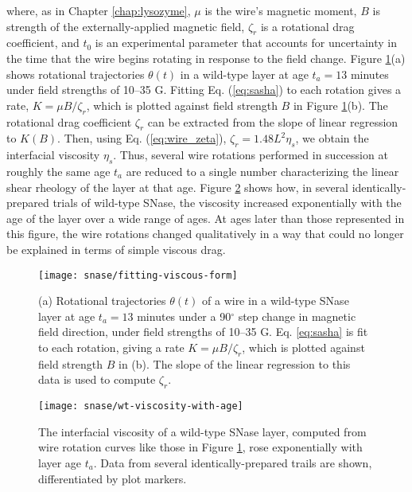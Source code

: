 \noindent where, as in Chapter \ref{chap:lysozyme}, $\mu$ is the wire's magnetic moment, $B$ is strength of the externally-applied magnetic field, $\zeta_r$ is a rotational drag coefficient, and $t_0$ is an experimental parameter that accounts for uncertainty in the time that the wire begins rotating in response to the field change. Figure \ref{fig:fitting-viscous-form}(a) shows rotational trajectories $\theta(t)$ in a wild-type layer at age $t_a=13$ minutes under field strengths of 10--35 G. Fitting Eq. (\ref{eq:sasha}) to each rotation gives a rate, $K=\mu B/\zeta_r$, which is plotted against field strength $B$ in Figure \ref{fig:fitting-viscous-form}(b). The rotational drag coefficient $\zeta_r$ can be extracted from the slope of linear regression to $K(B)$. Then, using Eq. (\ref{eq:wire_zeta}), $\zeta_r = 1.48 L^2\eta_s$, we obtain the interfacial viscosity $\eta_s$. Thus, several wire rotations performed in succession at roughly the same age $t_a$ are reduced to a single number characterizing the linear shear rheology of the layer at that age. Figure \ref{fig:wt-viscosity-with-age} shows how, in several identically-prepared trials of wild-type SNase, the viscosity increased exponentially with the age of the layer over a wide range of ages. At ages later than those represented in this figure, the wire rotations changed qualitatively in a way that could no longer be explained in terms of simple viscous drag.

   \begin{figure}
    \centering
    \texttt{[image: snase/fitting-viscous-form]} %
    \caption{\label{fig:fitting-viscous-form}(a) Rotational trajectories $\theta(t)$ of a wire in a wild-type SNase layer at age $t_a=13$ minutes under a 90$^\circ$ step change in magnetic field direction, under field strengths of 10--35 G. Eq. \ref{eq:sasha} is fit to each rotation, giving a rate $K=\mu B/\zeta_r$, which is plotted against field strength $B$ in (b). The slope of the linear regression to this data is used to compute $\zeta_r$.}
    \end{figure}

   \begin{figure}
    \centering
    \texttt{[image: snase/wt-viscosity-with-age]}
    \caption{\label{fig:wt-viscosity-with-age}The interfacial viscosity of a wild-type SNase layer, computed from wire rotation curves like those in Figure \ref{fig:fitting-viscous-form}, rose exponentially with layer age $t_a$. Data from several identically-prepared trails are shown, differentiated by plot markers.}
    \end{figure}
   

